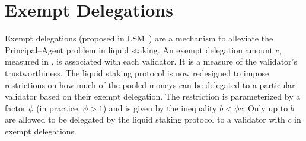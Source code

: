 \section{Exempt Delegations}

Exempt delegations (proposed in LSM~\cite{liquidity-staking-module})
are a mechanism to alleviate the Principal--Agent problem in liquid staking.
An exempt delegation amount $c$, measured in \asset, is associated
with each validator. It is a measure of the validator's trustworthiness.
The liquid staking protocol is now redesigned to impose restrictions
on how much of the pooled moneys can be delegated to a particular
validator based on their exempt delegation. The restriction is
parameterized by a factor $\phi$ (in practice, $\phi > 1$)
and is given by the inequality $b < \phi c$: Only up to $b$ \assets
are allowed to be delegated by the liquid staking protocol
to a validator with $c$ \asset in exempt delegations.

